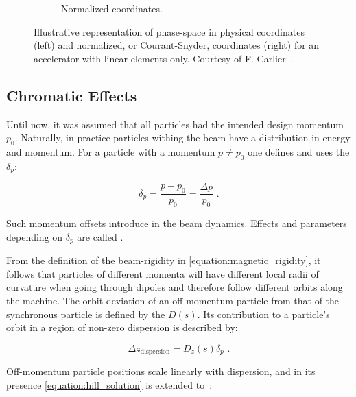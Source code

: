 \begin{figure}[!hbt]
\begin{subfigure}[b]{0.475\textwidth}
        \caption{Normalized coordinates.}
        \label{fig:phase_space_normalized}
    \end{subfigure}
    \caption{Illustrative representation of phase-space in physical coordinates (left) and normalized, or Courant-Snyder, coordinates (right) for an accelerator with linear elements only. Courtesy of F. Carlier~\cite{PHD:Carlier}.}
    \label{figure:phase_space_linear_physical_normalized_coordinates}
\end{figure}

\subsection{Chromatic Effects}
\label{subsection:chromatic_effects}

Until now, it was assumed that all particles had the intended design momentum \(p_{0}\).
Naturally, in practice particles withing the beam have a distribution in energy and momentum.
For a particle with a momentum \(p \neq p_{0}\) one defines and uses the  \(\delta_p\):

\begin{equation}
    \delta_p = \frac{p - p_0}{p_0} = \frac{\Delta p}{p_0} \text{ .}
    \label{equation:momentum_deviation}
\end{equation}

Such momentum offsets introduce  in the beam dynamics.
Effects and parameters depending on \(\delta_p\) are called .

From the definition of the \gls{beam-rigidity} in \cref{equation:magnetic_rigidity}, it follows that particles of different momenta will have different local radii of curvature when going through dipoles and therefore follow different orbits along the machine.
The orbit deviation of an off-momentum particle from that of the synchronous particle is defined by the  \(D(s)\).
Its contribution to a particle's orbit in a region of non-zero dispersion is described by:

\begin{equation}
    \Delta z_{\mathrm{dispersion}} = D_z(s) \delta_p \text{ .}
    \label{equation:dispersion_contribution_to_orbit}
\end{equation}
\bigbreak

Off-momentum particle positions scale linearly with dispersion, and in its presence \cref{equation:hill_solution} is extended to~\cite{BOOK:Wiedemann:Particle_Accelerator_Physics}:

